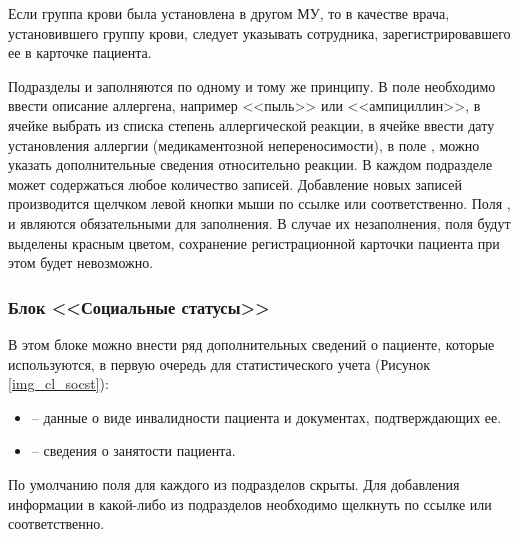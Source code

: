 {Если группа крови была установлена в другом МУ, то в качестве врача, установившего группу крови, следует указывать сотрудника, зарегистрировавшего ее в карточке пациента.


Подразделы  и  заполняются по одному и тому же принципу. В поле   необходимо ввести описание аллергена, например <<пыль>> или <<ампициллин>>, в ячейке  выбрать из списка степень аллергической реакции, в ячейке  ввести дату установления аллергии (медикаментозной непереносимости), в поле , можно указать дополнительные сведения относительно реакции. В каждом подразделе может содержаться любое количество записей. Добавление новых записей производится щелчком левой кнопки мыши по ссылке  или  соответственно. Поля ,  и  являются обязательными для заполнения. В случае их незаполнения, поля будут выделены красным цветом, сохранение регистрационной карточки пациента при этом будет невозможно.

\subsubsection{Блок <<Социальные статусы>>} 

В этом блоке можно внести ряд дополнительных сведений о пациенте, которые используются, в первую очередь для статистического учета (Рисунок \ref{img_cl_socst}): 

\begin{itemize}
 \item {} -- данные о виде инвалидности пациента и документах, подтверждающих ее.
 \item {} -- сведения о занятости пациента.
\end{itemize}

По умолчанию поля для каждого из подразделов скрыты. Для добавления информации в какой-либо из подразделов необходимо щелкнуть по ссылке  или  соответственно.

}
